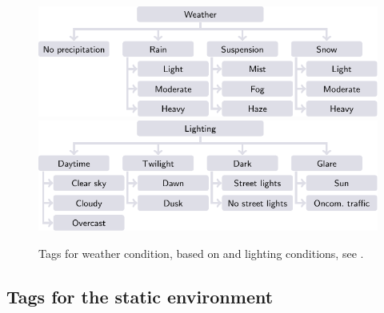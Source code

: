 \documentclass[twoside,twocolumn,9pt]{extarticle}
\theoremstyle{plain}
\begin{document}
\begin{figure}[t!]
	\centering
	\includegraphics{weather}\\
	\vspace{0.5em}
	\includegraphics{lighting}
	\caption{Tags for weather condition, based on \cite{mahmassani2012use} and lighting conditions, see \cite{golob2003relationships}.}
	\label{fig:conditions}
\end{figure}




%
%



\subsection{Tags for the static environment}
\label{sec:tags selection static}
\end{document}
